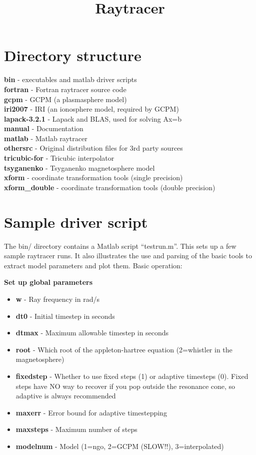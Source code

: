 \documentclass[10pt]{article}
\begin{document}
\title{Raytracer}
\section{Directory structure}
{\bf bin} - executables and matlab driver scripts \\
{\bf fortran} - Fortran raytracer source code \\
{\bf gcpm} - GCPM (a plasmasphere model) \\
{\bf iri2007} - IRI (an ionosphere model, required by GCPM) \\
{\bf lapack-3.2.1} - Lapack and BLAS, used for solving Ax=b \\
{\bf manual} - Documentation \\
{\bf matlab} - Matlab raytracer \\
{\bf othersrc} - Original distribution files for 3rd party sources \\
{\bf tricubic-for} - Tricubic interpolator \\
{\bf tsyganenko} - Tsyganenko magnetosphere model \\
{\bf xform} - coordinate transformation tools (single precision) \\
{\bf xform\_double} - coordinate transformation tools (double
precision) \\

\section{Sample driver script}
The bin/ directory contains a Matlab script ``testrun.m''.  This sets
up a few sample raytracer runs.  It also illustrates the use and
parsing of the basic tools to extract model parameters and plot them.
Basic operation:

{\bf Set up global parameters}
\begin{itemize}
\item {\bf w} - Ray frequency in rad/s
\item {\bf dt0} - Initial timestep in seconds
\item {\bf dtmax} - Maximum allowable timestep in seconds
\item {\bf root} - Which root of the appleton-hartree equation
  (2=whistler in the magnetosphere)
\item {\bf fixedstep} - 
  Whether to use fixed steps (1) or adaptive timesteps (0).
  Fixed steps have NO way to recover if you pop outside the resonance
  cone, so adaptive is always recommended
\item {\bf maxerr} - Error bound for adaptive timestepping
\item {\bf maxsteps} - Maximum number of steps
\item {\bf modelnum} - Model (1=ngo, 2=GCPM (SLOW!!), 3=interpolated)
\end{itemize}
\end{document}
